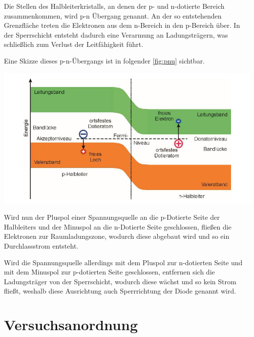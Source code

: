 \documentclass[11pt,ngerman]{scrartcl}
\begin{document}
Die Stellen des Halbleiterkristalls, an denen der p- und n-dotierte Bereich zusammenkommen, wird p-n Übergang genannt. An der so entstehenden Grenzfläche treten die Elektronen aus dem n-Bereich in den p-Bereich über. In der Sperrschicht entsteht dadurch eine Verarmung an Ladungsträgern, was schließlich zum Verlust der Leitfähigkeit führt.

\vspace{2mm}

Eine Skizze dieses p-n-Übergangs ist in folgender \autoref{fig:pnu} sichtbar.

\begin{center}
	\begin{minipage}[t]{0.65\textwidth}
		\includegraphics[width=\textwidth]{pnu}
		\label{fig:pnu}
	\end{minipage}
\end{center}

Wird nun der Pluspol einer Spannungsquelle an die p-Dotierte Seite der Halbleiters und der Minuspol an die n-Dotierte Seite geschlossen, fließen die Elektronen zur Raumladungszone, wodurch diese abgebaut wird und so ein Durchlassstrom entsteht.

Wird die Spannungsquelle allerdings mit dem Pluspol zur n-dotierten Seite und mit dem Minuspol zur p-dotierten Seite geschlossen, entfernen sich die Ladungsträger von der Sperrschicht, wodurch diese wächst und so kein Strom fließt, weshalb diese Ausrichtung auch Sperrrichtung der Diode genannt wird. \cite{deimel2015grundlagen} \cite{demtroder2018ex2}



\section{Versuchsanordnung}\label{sec:Versuchsanordnung}
\end{document}
